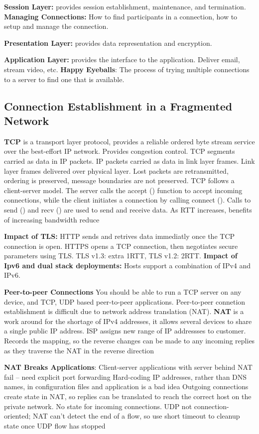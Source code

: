 \documentclass{article}
\begin{document}
\textbf{Session Layer:} provides session establishment, maintenance, and termination.
\textbf{Managing Connections:} How to find participants in a connection, how to setup and manage the connection.

\textbf{Presentation Layer:} provides data representation and encryption.

\textbf{Application Layer:} provides the interface to the application. Deliver email, stream video, etc.
\textbf{Happy Eyeballs}: The process of trying multiple connections to a server to find one that is available.


\subsection*{Connection Establishment in a Fragmented Network}

\textbf{TCP} is a transport layer protocol, provides a reliable ordered byte stream service over the
best-effort IP network. Provides congestion control.
TCP segments carried as data in IP packets.
IP packets carried as data in link layer frames. Link layer frames delivered over physical layer.
Lost packets are retransmitted, ordering is preserved, message boundaries are not preserved.
TCP follows a client-server model.
The server calls the accept () function to accept incoming connections, while the client initiates a connection by calling connect ().
Calls to send () and recv () are used to send and receive data.
As RTT increases, benefits of increasing bandwidth reduce

\textbf{Impact of TLS:}
HTTP sends and retrives data immediatly once the TCP connection is open.
HTTPS opens a TCP connection, then negotiates secure parameters using TLS.\@
TLS v1.3: extra 1RTT, TLS v1.2: 2RTT.\@
\textbf{Impact of Ipv6 and dual stack deployments:}
Hosts support a combination of IPv4 and IPv6.

\textbf{Peer-to-peer Connections}
You should be able to run a TCP server on any device, and TCP, UDP based peer-to-peer applications.
Peer-to-peer connetion establishment is difficult due to network address translation (NAT).
\textbf{NAT} is a work around for the shortage of IPv4 addresses, it allows several devices to share a single public IP address.
ISP assigns new range of IP addressses to customer.
Records the mapping, so the reverse changes can be made to any incoming replies as they traverse the NAT in the reverse direction

\textbf{NAT Breaks Applications}:
Client-server applications with server behind NAT fail – need explicit port forwarding
Hard-coding IP addresses, rather than DNS names, in configuration files and application is a bad idea
Outgoing connections create state in NAT, so replies can be translated to reach the correct host on the private network.
No state for incoming connections.
UDP not connection-oriented; NAT can’t detect the end of a flow, so use short timeout to cleanup state once UDP flow has stopped
\end{document}
